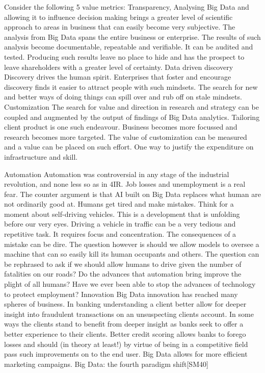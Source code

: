 Consider the following 5 value metrics:
Transparency, \cite{sagiroglu2013big}
Analysing Big Data and allowing it to influence decision making brings a greater level of scientific approach to areas in business that can easily become very subjective.  The analysis from Big Data spans the entire business or enterprise.  The results of such analysis become documentable, repeatable and verifiable.  It can be audited and tested.  Producing such results leave no place to hide and has the prospect to leave shareholders with a greater level of certainty.
Data driven discovery
Discovery drives the human spirit.  Enterprises that foster and encourage discovery finds it easier to attract people with such mindsets. The search for new and better ways of doing things can spill over and rub off on stale mindsets.
Customization
The search for value and direction in research and strategy can be coupled and augmented by the output of findings of Big Data analytics.   Tailoring client product is one such endeavour.  Business becomes more focussed and research becomes more targeted.  The value of customization can be measured and a value can be placed on such effort.  One way to justify the expenditure on infrastructure and skill.

Automation
Automation was controversial in any stage of the industrial revolution, and none less so as in 4IR. Job losses and unemployment is a real fear.  The counter argument is that AI built on Big Data replaces what human are not ordinarily good at.  Humans get tired and make mistakes.   Think for a moment about self-driving vehicles.  This is a development that is unfolding before our very eyes.  Driving a vehicle in traffic can be a very tedious and repetitive task.  It requires focus and concentration.  The consequences of a mistake can be dire.  The question however is should we allow models to oversee a machine that can so easily kill its human occupants and others.  The question can be rephrased to ask if we should allow humans to drive given the number of fatalities on our roads?  
Do the advances that automation bring improve the plight of all humans?
Have we ever been able to stop the advances of technology to protect employment? 
Innovation
Big Data innovation has reached many spheres of business.  In banking understanding a client better allow for deeper insight into fraudulent transactions on an unsuspecting clients account.  In some ways the clients stand to benefit from deeper insight as banks seek to offer a better experience to their clients.  Better credit scoring allows banks to forego losses and should (in theory at least!) by virtue of being in a competitive field pass such improvements on to the end user.  Big Data allows for more efficient marketing campaigns.
Big Data: the fourth paradigm shift[SM40]

